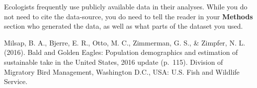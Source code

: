 \documentclass[11pt,]{article}
\begin{document}
Ecologists frequently use publicly available data in their analyses.
While you do not need to cite the data-source, you do need to tell the
reader in your \textbf{Methods} section who generated the data, as well
as what parts of the dataset you used.

\medskip

Milsap, B. A., Bjerre, E. R., Otto, M. C., Zimmerman, G. S., \& Zimpfer,
N. L. (2016). Bald and Golden Eagles: Population demographics and
estimation of sustainable take in the United States, 2016 update
(p.~115). Division of Migratory Bird Management, Washington D.C., USA:
U.S. Fish and Wildlife Service.




\newpage
\singlespacing 
\end{document}
